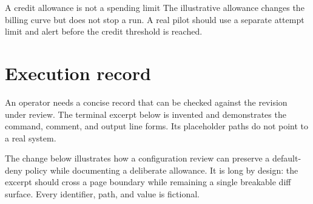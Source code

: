 \documentclass[publication-type=technical-report,theme=operator]{reportkit}
\begin{document}
\begin{redflag}{A credit allowance is not a spending limit}
The illustrative allowance changes the billing curve but does not stop a
run. A real pilot should use a separate attempt limit and alert before the
credit threshold is reached.
\end{redflag}

\clearpage
\section{Execution record}
An operator needs a concise record that can be checked against the revision
under review. The terminal excerpt below is invented and demonstrates the
command, comment, and output line forms. Its placeholder paths do not point
to a real system.

\begin{terminalblock}
\end{terminalblock}

The change below illustrates how a configuration review can preserve a
default-deny policy while documenting a deliberate allowance. It is long by
design: the excerpt should cross a page boundary while remaining a single
breakable diff surface. Every identifier, path, and value is fictional.
\end{document}
